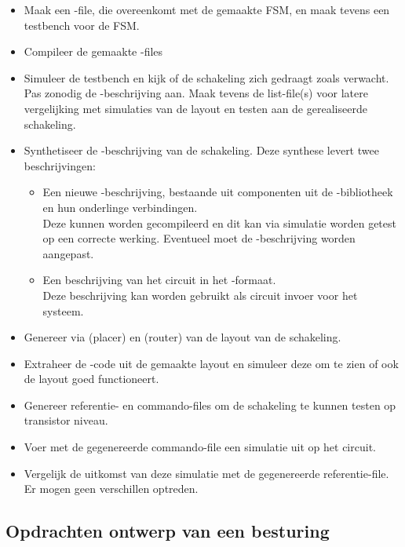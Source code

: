 \begin{itemize}
\item
Maak een -file, die overeenkomt met de gemaakte FSM, en maak tevens
een testbench voor de FSM.
\item
Compileer de gemaakte -files
\item
Simuleer de testbench en kijk of de schakeling zich gedraagt zoals verwacht.
Pas zonodig de -beschrijving aan.
Maak tevens de list-file(s) voor latere vergelijking met simulaties
van de layout en testen aan de gerealiseerde schakeling.
\item
Synthetiseer de -beschrijving van de schakeling.
Deze synthese levert twee beschrijvingen:
\begin{itemize}
\item
Een nieuwe -beschrijving, bestaande uit componenten uit de
-bibliotheek en hun onderlinge verbindingen.\\
Deze kunnen worden gecompileerd en dit kan via simulatie worden
getest op een correcte werking.
Eventueel moet de -beschrijving worden aangepast.
\item
Een beschrijving van het circuit in het -formaat.\\
Deze beschrijving kan worden gebruikt als circuit invoer voor het
 systeem. 
\end{itemize} 
\item
Genereer via  (placer) en  (router) van  de layout
van de schakeling.
\item
Extraheer de -code uit de gemaakte layout en simuleer deze om
te zien of ook de layout goed functioneert.
\item
Genereer referentie- en commando-files om de schakeling te kunnen testen
op transistor niveau.
\item
Voer met de gegenereerde commando-file een simulatie uit op het circuit.
\item
Vergelijk de uitkomst van deze simulatie met de gegenereerde referentie-file.
Er mogen geen verschillen optreden.
\end{itemize}

\clearpage

\clearpage

\clearpage

\subsection{Opdrachten ontwerp van een besturing}
